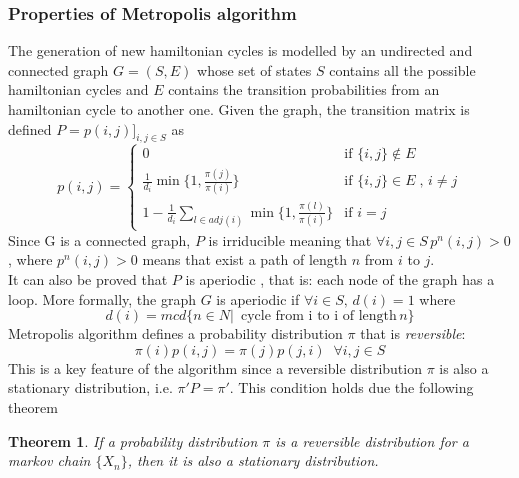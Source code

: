 \documentclass{article}
\newtheorem{theorem}{Theorem}
\begin{document}
\subsubsection{Properties of Metropolis algorithm}
The generation of new hamiltonian cycles is modelled by an undirected and connected graph $G = (S,E)$ whose set of states $S$ contains all the possible hamiltonian cycles and $E$ contains the transition probabilities from an hamiltonian cycle to another one. Given the graph, the transition matrix is defined $P=p(i,j)]_{i,j\in S}$ as
\begin{equation}
p(i,j) =  \begin{cases} 
	0\, & \mbox{if } \{i,j\} \notin E  \\ 
	\frac{1}{d_i} \min\{1,\frac{\pi(j)}{\pi(i)}\} & \mbox{if }  \{i,j\} \in E \;,\, i \neq j\\
	1-\frac{1}{d_i} \sum_{l \in adj(i)} \min\{1,\frac{\pi(l)}{\pi(i)}\}  & \mbox{if }  i = j 
\end{cases}
\end{equation}
Since G is a connected graph, $P$ is irriducible meaning that $\forall i,j \in S \, p^n(i,j) > 0$, where $p^n(i,j) > 0$ means that exist a path of length $n$ from $i$ to $j$.\\
It can also be proved that $P$ is aperiodic \cite{metropolis}, that is: each node of the graph has a loop. More formally, the graph $G$ is aperiodic if $\forall i \in S, \,d(i)  = 1$ where
\begin{equation}
d(i) = mcd \{n \in N | \, \text{ cycle from i to i of length} \, n\}
\end{equation}
Metropolis algorithm defines a probability distribution $\pi$ that is \textit{reversible}:
\begin{equation}
	\pi(i)p(i,j) = \pi(j)p(j,i) \;\; \forall i,j \in S
\end{equation}
This is a key feature of the algorithm since a reversible distribution $\pi$ is also a stationary distribution, i.e. $\pi'P=\pi'$. This condition holds due the following theorem
\begin{theorem}
If a probability distribution $\pi$ is a reversible distribution for a markov chain $ \{X_n\} $, then it is also a stationary distribution.
\end{theorem}
\end{document}
